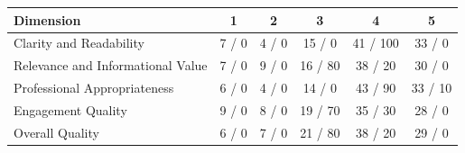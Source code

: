 \begin{tabular}{lccccc}
\toprule
Dimension & 1 & 2 & 3 & 4 & 5 \\
\midrule
Clarity and Readability & 7 / 0 & 4 / 0 & 15 / 0 & 41 / 100 & 33 / 0 \\
Relevance and Informational Value & 7 / 0 & 9 / 0 & 16 / 80 & 38 / 20 & 30 / 0 \\
Professional Appropriateness & 6 / 0 & 4 / 0 & 14 / 0 & 43 / 90 & 33 / 10 \\
Engagement Quality & 9 / 0 & 8 / 0 & 19 / 70 & 35 / 30 & 28 / 0 \\
Overall Quality & 6 / 0 & 7 / 0 & 21 / 80 & 38 / 20 & 29 / 0 \\
\bottomrule
\end{tabular}
